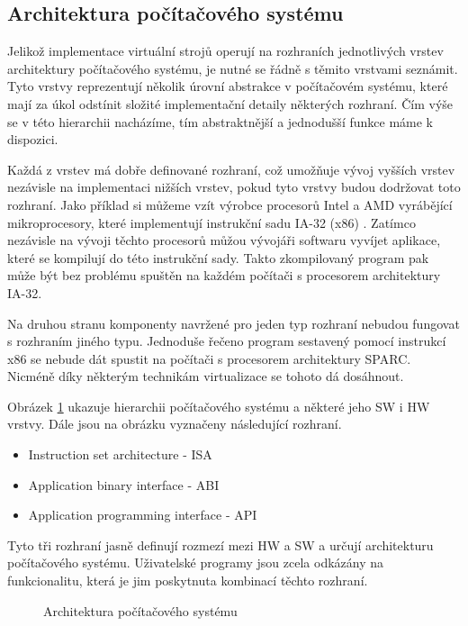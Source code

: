   \subsection{Architektura počítačového systému}
  \label{subsection:computer_architecture}
  
  Jelikož implementace virtuální strojů operují na rozhraních jednotlivých vrstev architektury počítačového systému, je nutné se řádně s těmito vrstvami seznámit. Tyto vrstvy reprezentují několik úrovní abstrakce v
  počítačovém systému, které mají za úkol odstínit složité implementační detaily některých rozhraní. Čím výše se v této hierarchii nacházíme, tím abstraktnější a jednodušší funkce máme k dispozici.
  
  Každá z vrstev má dobře definované rozhraní, což umožňuje vývoj vyšších vrstev nezávisle na implementaci nižších vrstev, pokud tyto vrstvy budou dodržovat toto rozhraní. Jako příklad si můžeme vzít výrobce procesorů
  Intel a AMD vyrábějící mikroprocesory, které implementují instrukční sadu IA-32 (x86) \cite{book:iee:vm_architecture}. Zatímco nezávisle na vývoji těchto procesorů můžou vývojáři softwaru vyvíjet aplikace, které
  se kompilují do této instrukční sady. Takto zkompilovaný program pak může být bez problému spuštěn na každém počítači s procesorem architektury IA-32.
  
  Na druhou stranu komponenty navržené pro jeden typ rozhraní nebudou fungovat s rozhraním jiného typu. Jednoduše řečeno program sestavený pomocí instrukcí x86 se nebude dát spustit na počítači s procesorem architektury
  SPARC. Nicméně díky některým technikám virtualizace se tohoto dá dosáhnout. 
  
  Obrázek \ref{figure:computer_architecture} ukazuje hierarchii počítačového systému a některé jeho SW i HW vrstvy. Dále jsou na obrázku vyznačeny následující rozhraní.
  
  \begin{itemize}
   \item Instruction set architecture - ISA
   \item Application binary interface - ABI
   \item Application programming interface - API
  \end{itemize}

  Tyto tři rozhraní jasně definují rozmezí mezi HW a SW a určují architekturu počítačového systému. Uživatelské programy jsou zcela odkázány na funkcionalitu, která je jim poskytnuta kombinací těchto rozhraní.
  

    \begin{figure}
      \centering          
      \caption[Architektura počítačového systému]{Architektura počítačového systému \cite{book:iee:vm_architecture}}
      \label{figure:computer_architecture}
    \end{figure}


